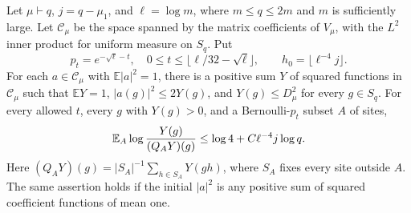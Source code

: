 \begin{lemma}\label{rec:pointwise-smoothing}
Let $\mu\vdash q$, $j=q-\mu_1$, and $\ell=\log m$, where
$m\le q\le2m$ and $m$ is sufficiently large. Let $\mathcal C_\mu$
be the space spanned by the matrix coefficients of $V_\mu$, with
the $L^2$ inner product for uniform measure on $S_q$. Put
\[
 p_t=e^{-\sqrt\ell-t},\quad
 0\le t\le\lfloor\ell/32-\sqrt\ell\rfloor,
 \qquad h_0=\lfloor\ell^{-4}j\rfloor.
\]
For each $a\in\mathcal C_\mu$ with $\mathbb E|a|^2=1$, there is a
positive sum $Y$ of squared functions in $\mathcal C_\mu$ such that
$\mathbb E Y=1$, $|a(g)|^2\le2Y(g)$, and
$Y(g)\le D_\mu^2$ for every $g\in S_q$. For every allowed $t$,
every $g$ with $Y(g)>0$, and a Bernoulli-$p_t$ subset $A$ of sites,
\begin{equation}\label{rec:smoothing-ratio}
 \mathbb E_A\log\frac{Y(g)}{(Q_A Y)(g)}
 \le\log4+C\ell^{-4}j\log q.
\end{equation}
Here $(Q_A Y)(g)=|S_A|^{-1}\sum_{h\in S_A}Y(gh)$, where $S_A$
fixes every site outside $A$. The same assertion holds if the
initial $|a|^2$ is any positive sum of squared coefficient functions
of mean one.
\end{lemma}
